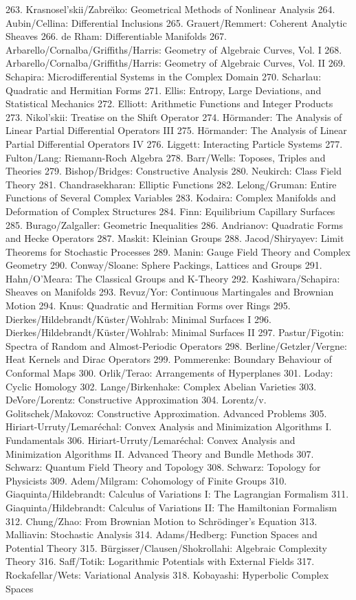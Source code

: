 263. Krasnosel'skii/Zabre\u{\i}ko: Geometrical Methods of Nonlinear Analysis
264. Aubin/Cellina: Differential Inclusions
265. Grauert/Remmert: Coherent Analytic Sheaves
266. de Rham: Differentiable Manifolds
267. Arbarello/Cornalba/Griffiths/Harris: Geometry of Algebraic Curves, Vol. I
268. Arbarello/Cornalba/Griffiths/Harris: Geometry of Algebraic Curves, Vol. II
269. Schapira: Microdifferential Systems in the Complex Domain
270. Scharlau: Quadratic and Hermitian Forms
271. Ellis: Entropy, Large Deviations, and Statistical Mechanics
272. Elliott: Arithmetic Functions and Integer Products
273. Nikol'skii: Treatise on the Shift Operator
274. H\"ormander: The Analysis of Linear Partial Differential Operators III
275. H\"ormander: The Analysis of Linear Partial Differential Operators IV
276. Liggett: Interacting Particle Systems
277. Fulton/Lang: Riemann-Roch Algebra
278. Barr/Wells: Toposes, Triples and Theories
279. Bishop/Bridges: Constructive Analysis
280. Neukirch: Class Field Theory
281. Chandrasekharan: Elliptic Functions
282. Lelong/Gruman: Entire Functions of Several Complex Variables
283. Kodaira: Complex Manifolds and Deformation of Complex Structures
284. Finn: Equilibrium Capillary Surfaces
285. Burago/Zalgaller: Geometric Inequalities
286. Andrianov: Quadratic Forms and Hecke Operators
287. Maskit: Kleinian Groups
288. Jacod/Shiryayev: Limit Theorems for Stochastic Processes
289. Manin: Gauge Field Theory and Complex Geometry
290. Conway/Sloane: Sphere Packings, Lattices and Groups
291. Hahn/O'Meara: The Classical Groups and K-Theory
292. Kashiwara/Schapira: Sheaves on Manifolds
293. Revuz/Yor: Continuous Martingales and Brownian Motion
294. Knus: Quadratic and Hermitian Forms over Rings
295. Dierkes/Hildebrandt/K{\"u}ster/Wohlrab: Minimal Surfaces I
296. Dierkes/Hildebrandt/K{\"u}ster/Wohlrab: Minimal Surfaces II
297. Pastur/Figotin: Spectra of Random and Almost-Periodic Operators
298. Berline/Getzler/Vergne: Heat Kernels and Dirac Operators
299. Pommerenke: Boundary Behaviour of Conformal Maps
300. Orlik/Terao: Arrangements of Hyperplanes
301. Loday: Cyclic Homology
302. Lange/Birkenhake: Complex Abelian Varieties
303. DeVore/Lorentz: Constructive Approximation
304. Lorentz/v. Golitschek/Makovoz: Constructive Approximation. Advanced Problems
305. Hiriart-Urruty/Lemar\'echal: Convex Analysis and Minimization Algorithms I.
Fundamentals
306. Hiriart-Urruty/Lemar\'echal: Convex Analysis and Minimization Algorithms II.
Advanced Theory and Bundle Methods
307. Schwarz: Quantum Field Theory and Topology
308. Schwarz: Topology for Physicists
309. Adem/Milgram: Cohomology of Finite Groups
310. Giaquinta/Hildebrandt: Calculus of Variations I: The Lagrangian Formalism
311. Giaquinta/Hildebrandt: Calculus of Variations II: The Hamiltonian Formalism
312. Chung/Zhao: From Brownian Motion to Schr\"odinger's Equation
313. Malliavin: Stochastic Analysis
314. Adams/Hedberg: Function Spaces and Potential Theory
315. B\"urgisser/Clausen/Shokrollahi: Algebraic Complexity Theory
316. Saff/Totik: Logarithmic Potentials with External Fields
317. Rockafellar/Wets: Variational Analysis
318. Kobayashi: Hyperbolic Complex Spaces

